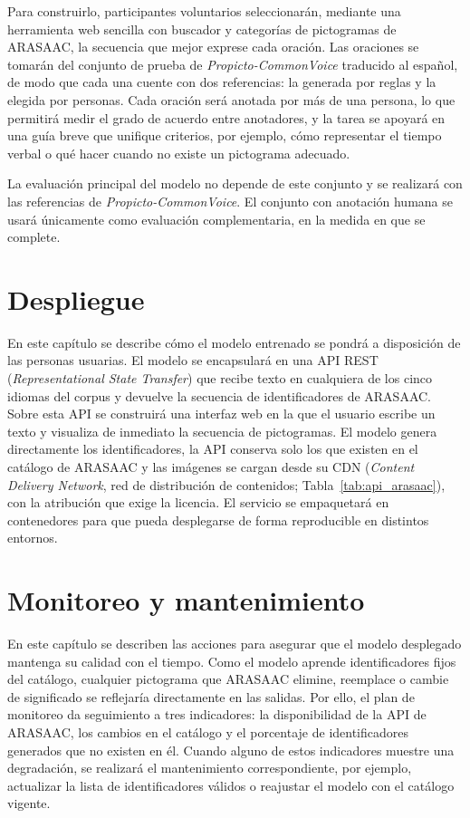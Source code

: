Para construirlo, participantes voluntarios seleccionarán, mediante una herramienta web sencilla con buscador y categorías de pictogramas de ARASAAC, la secuencia que mejor exprese cada oración. Las oraciones se tomarán del conjunto de prueba de \textit{Propicto-CommonVoice} traducido al español, de modo que cada una cuente con dos referencias: la generada por reglas y la elegida por personas. Cada oración será anotada por más de una persona, lo que permitirá medir el grado de acuerdo entre anotadores, y la tarea se apoyará en una guía breve que unifique criterios, por ejemplo, cómo representar el tiempo verbal o qué hacer cuando no existe un pictograma adecuado.

La evaluación principal del modelo no depende de este conjunto y se realizará con las referencias de \textit{Propicto-CommonVoice}. El conjunto con anotación humana se usará únicamente como evaluación complementaria, en la medida en que se complete.
\clearpage
\section{Despliegue}
\label{sec:despliegue}

En este capítulo se describe cómo el modelo entrenado se pondrá a disposición de las personas usuarias. El modelo se encapsulará en una API REST (\textit{Representational State Transfer}) que recibe texto en cualquiera de los cinco idiomas del corpus y devuelve la secuencia de identificadores de ARASAAC. Sobre esta API se construirá una interfaz web en la que el usuario escribe un texto y visualiza de inmediato la secuencia de pictogramas. El modelo genera directamente los identificadores, la API conserva solo los que existen en el catálogo de ARASAAC y las imágenes se cargan desde su CDN (\textit{Content Delivery Network}, red de distribución de contenidos; Tabla~\ref{tab:api_arasaac}), con la atribución que exige la licencia. El servicio se empaquetará en contenedores para que pueda desplegarse de forma reproducible en distintos entornos.
\clearpage
\section{Monitoreo y mantenimiento}
\label{sec:monitoreo}

En este capítulo se describen las acciones para asegurar que el modelo desplegado mantenga su calidad con el tiempo. Como el modelo aprende identificadores fijos del catálogo, cualquier pictograma que ARASAAC elimine, reemplace o cambie de significado se reflejaría directamente en las salidas. Por ello, el plan de monitoreo da seguimiento a tres indicadores: la disponibilidad de la API de ARASAAC, los cambios en el catálogo y el porcentaje de identificadores generados que no existen en él. Cuando alguno de estos indicadores muestre una degradación, se realizará el mantenimiento correspondiente, por ejemplo, actualizar la lista de identificadores válidos o reajustar el modelo con el catálogo vigente.
